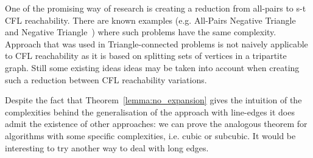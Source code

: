 \documentclass[12pt]{article}
\begin{document}
One of the promising way of research is creating a reduction from all-pairs to s-t CFL reachability. There are known examples (e.g. All-Pairs Negative Triangle and Negative Triangle~\cite{Williams2009TriangleDV}) where such problems have the same complexity. Approach that was used in Triangle-connected problems is not naively applicable to CFL reachability as it is based on splitting sets of vertices in a tripartite graph. Still some existing ideas ideas may be taken into account when creating such a reduction between CFL reachability variations.

Despite the fact that Theorem~\ref{lemma:no_expansion} gives the intuition of the complexities behind the generalisation of the approach with line-edges it does admit the existence of other approaches: we can prove the analogous theorem for algorithms with some specific complexities, i.e. cubic or subcubic. It would be interesting to try another way to deal with long edges.
 
\printbibliography
\end{document}
